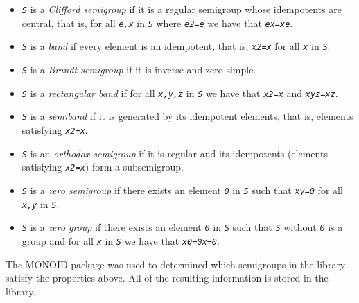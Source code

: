 \documentclass[a4paper,11pt]{report}
\begin{document}
{{\begin{itemize}
\item  \mbox{\texttt{\mdseries\slshape S}} is a \emph{Clifford semigroup} if it is a regular semigroup whose idempotents are central, that is, for all \mbox{\texttt{\mdseries\slshape e,x}} in \mbox{\texttt{\mdseries\slshape S}} where \mbox{\texttt{\mdseries\slshape e\texttt{}2=e}} we have that \mbox{\texttt{\mdseries\slshape ex=xe}}. 
\item  \mbox{\texttt{\mdseries\slshape S}} is a \emph{band} if every element is an idempotent, that is, \mbox{\texttt{\mdseries\slshape x\texttt{}2=x}} for all \mbox{\texttt{\mdseries\slshape x}} in \mbox{\texttt{\mdseries\slshape S}}.
\item  \mbox{\texttt{\mdseries\slshape S}} is a \emph{Brandt semigroup} if it is inverse and zero simple.
\item  \mbox{\texttt{\mdseries\slshape S}} is a \emph{rectangular band} if for all \mbox{\texttt{\mdseries\slshape x,y,z}} in \mbox{\texttt{\mdseries\slshape S}} we have that \mbox{\texttt{\mdseries\slshape x\texttt{}2=x}} and \mbox{\texttt{\mdseries\slshape xyz=xz}}.
\item  \mbox{\texttt{\mdseries\slshape S}} is a \emph{semiband} if it is generated by its idempotent elements, that is, elements satisfying \mbox{\texttt{\mdseries\slshape x\texttt{}2=x}}.
\item  \mbox{\texttt{\mdseries\slshape S}} is an \emph{orthodox semigroup} if it is regular and its idempotents (elements satisfying \mbox{\texttt{\mdseries\slshape x\texttt{}2=x}}) form a subsemigroup.
\item \mbox{\texttt{\mdseries\slshape S}} is a \emph{zero semigroup} if there exists an element \mbox{\texttt{\mdseries\slshape 0}} in \mbox{\texttt{\mdseries\slshape S}} such that \mbox{\texttt{\mdseries\slshape xy=0}} for all \mbox{\texttt{\mdseries\slshape x,y}} in \mbox{\texttt{\mdseries\slshape S}}.
\item \mbox{\texttt{\mdseries\slshape S}} is a \emph{zero group} if there exists an element \mbox{\texttt{\mdseries\slshape 0}} in \mbox{\texttt{\mdseries\slshape S}} such that \mbox{\texttt{\mdseries\slshape S}} without \mbox{\texttt{\mdseries\slshape 0}} is a group and for all \mbox{\texttt{\mdseries\slshape x}} in \mbox{\texttt{\mdseries\slshape S}} we have that \mbox{\texttt{\mdseries\slshape x0=0x=0}}.
\end{itemize}
 The \textsf{MONOID} package was used to determined which semigroups in the library satisfy the
properties above. All of the resulting information is stored in the library. 

}}
\end{document}
